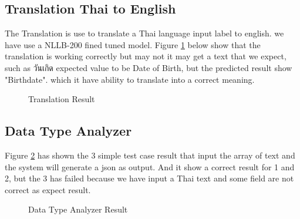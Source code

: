 \documentclass[12pt,oneside,openright,a4paper]{cpe-english-project}
\begin{document}
\subsection{Translation Thai to English}
The Translation is use to translate a Thai language input label to english. we have use a NLLB-200 fined tuned model. Figure \ref{fig:trans-result} below show that the translation is working correctly but may not it may get a text that we expect, such as \textthai{วันเกิด} expected value to be Date of Birth, but the predicted result show "Birthdate". which it have ability to translate into a correct meaning.

\begin{figure}[H]
\centering
{}
\caption{Translation Result}\label{fig:trans-result}
\end{figure}

\subsection{Data Type Analyzer}
Figure \ref{fig:datatype-result} has shown the 3 simple test case result that input the array of text and the system will generate a json as output. And it show a correct result for 1 and 2, but the 3 has failed because we have input a Thai text and some field are not correct as expect result.

\begin{figure}[H]
\centering
{}
\caption{Data Type Analyzer Result}\label{fig:datatype-result}
\end{figure}
\end{document}
